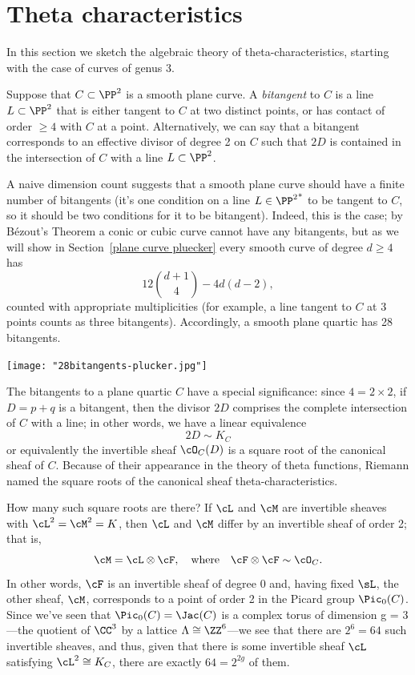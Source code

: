 \section{Theta characteristics}

In this section we sketch the algebraic theory of theta-characteristics, starting with the case of curves of genus 3.

Suppose that $C \subset \PP^2$ is a smooth plane curve. A \emph{bitangent} to $C$ is a line $L \subset \PP^2$ that is either tangent to $C$ at two distinct points, or has contact of order $\geq 4$ with $C$ at a point. Alternatively, we can say that a bitangent  corresponds to an effective divisor of degree 2 on $C$ such that $2D$ is contained in the intersection of $C$ with a line $L \subset \PP^2$.

A naive dimension count suggests that a smooth plane curve should have a finite number of bitangents (it's one condition on a line $L \in {\PP^2}^*$ to be tangent to $C$, so it should be two conditions for it to be bitangent). Indeed, this is the case; by B\'ezout's Theorem a conic or cubic curve cannot have any bitangents, but as we will show in Section~\ref{plane curve pluecker} every smooth curve of degree $d \geq 4$ has 
$$
12\binom{d+1}{4} - 4d(d-2),
$$
counted with appropriate multiplicities (for example, a line tangent to $C$ at 3 points  counts as three bitangents). Accordingly, a smooth plane quartic has 28 bitangents.

\centerline{\texttt{[image: "28bitangents-plucker.jpg"]}}

The bitangents to a plane quartic $C$ have a special significance: since $4 = 2 \times 2$, if $D = p+q$ is a bitangent, then the divisor $2D$ comprises the complete intersection of $C$ with a line; in other words, we have a linear equivalence
$$
2D \sim K_C
$$
or equivalently the invertible sheaf $\cO_C(D)$ is a square root of the canonical sheaf of $C$. Because of their appearance in the theory of theta functions, Riemann named the square roots of the canonical sheaf theta-characteristics.

How many such square roots are there? If $\cL$ and $\cM$ are invertible sheaves with $\cL^2 = \cM^2 = K$, then $\cL$ and $\cM$ differ by an invertible sheaf of order 2; that is,
$$
\cM = \cL \otimes \cF, \quad \text{where} \quad \cF \otimes \cF \sim \cO_C.
$$
In other words, $\cF$ is an invertible sheaf of degree 0 and, having fixed $\sL$,  the other sheaf, $\cM$, corresponds to a point of order 2 in the Picard group $\Pic_0(C)$. Since we've seen that $\Pic_0(C) = \Jac(C)$ is a complex torus of dimension g = 3---the quotient of $\CC^3$ by a lattice $\Lambda \cong \ZZ^6$---we see that there are $2^6 = 64$ such invertible sheaves, and thus, given that there is some invertible sheaf $\cL$ satisfying $\cL^2 \cong K_C$, there are exactly $64 = 2^{2g}$ of them.

